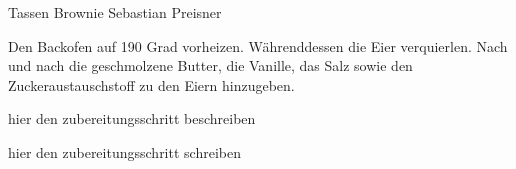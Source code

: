 \begin{recipe}[]{ Tassen Brownie }{ Sebastian Preisner }{  }



\step
Den Backofen auf 190 Grad vorheizen. Währenddessen die Eier verquierlen. Nach und nach die geschmolzene Butter, die Vanille, das Salz sowie den Zuckeraustauschstoff zu den Eiern hinzugeben. 

\step
hier den zubereitungsschritt beschreiben


\step
hier den zubereitungsschritt schreiben


\end{recipe}